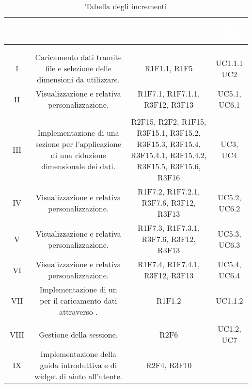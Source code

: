 \newpage
{
\setlength\arrayrulewidth{1pt}
\setlength\colA{1.5cm}
\setlength\colB{8cm}
\setlength\colC{4cm}
\setlength\colD{2cm}
\setlength\total{\dimexpr\colA+\colB+\colC+\colD+6\tabcolsep\relax}
\begin{longtable}{C{\colA} | C{\colB} | C{\colC} | C{\colD}}
		\textcolor{white}{\textbf{Incr.}} & 
		\textcolor{white}{\textbf{Obbiettivo}} & 
		\textcolor{white}{\textbf{Requisiti}} & 
		\textcolor{white}{\textbf{Casi d'uso}} \\
		\endfirsthead
	    \\
	    \endfoot
	    \caption{Tabella degli incrementi}
	    \endlastfoot


\\
I &
Caricamento dati tramite file e selezione delle dimensioni da utilizzare.& 
R1F1.1, R1F5 & 
UC1.1.1 \newline UC2\\
II &
Visualizzazione  e relativa personalizzazione.& 
R1F7.1, R1F7.1.1, R3F12, R3F13 & 
UC5.1, UC6.1\\
\\
III & 
Implementazione di una sezione per l'applicazione di una riduzione dimensionale dei dati. & 
R2F15, R2F2, R1F15, R3F15.1, R3F15.2, R3F15.3, R3F15.4, R3F15.4.1, R3F15.4.2, R3F15.5, R3F15.6, R3F16& 
UC3, UC4\\
IV & 
Visualizzazione  e relativa personalizzazione. & 
R1F7.2, R1F7.2.1, R3F7.6, R3F12, R3F13 & 
UC5.2, UC6.2\\
V & 
Visualizzazione  e relativa personalizzazione. & 
R1F7.3, R1F7.3.1, R3F7.6, R3F12, R3F13& 
UC5.3, UC6.3\\
VI & 
Visualizzazione  e relativa personalizzazione. & 
R1F7.4, R1F7.4.1, R3F12, R3F13& 
UC5.4, UC6.4\\
VII & 
Implementazione di un  per il caricamento dati attraverso . & 
R1F1.2 & 
UC1.1.2\\

\\
VIII & 
Gestione della sessione. & 
R2F6 & 
UC1.2, UC7\\
IX & 
Implementazione della guida introduttiva e di widget di aiuto all'utente. & 
R2F4, R3F10& 
\\


\end{longtable}
}